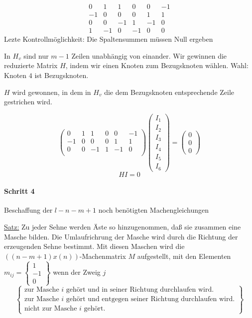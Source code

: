 \documentclass[german]{article}
\begin{document}
	\[
		\begin{array}{cccccc}
			0 & 1 & 1 & 0 & 0 & -1 \\
			-1 & 0 & 0 & 0 & 1 & 1 \\
			0 & 0 & -1 & 1 & -1 & 0 \\
			1 & -1 & 0 & -1 & 0 & 0
		\end{array}
	\]
	Lezte Kontrollmöglichkeit: Die Spaltensummen müssen Null ergeben

	In $H_v$ sind nur $m-1$ Zeilen unabhängig von einander. Wir gewinnen die reduzierte Matrix $H$, indem wir einen Knoten zum Bezugsknoten wählen. Wahl: Knoten $4$ ist Bezugsknoten.

	$H$ wird gewonnen, in dem in $H_v$ die dem Bezugsknoten entsprechende Zeile gestrichen wird.

	\[
		\left(
		\begin{array}{cccccc}
			0 & 1 & 1 & 0 & 0 & -1 \\
			-1 & 0 & 0 & 0 & 1 & 1 \\
			0 & 0 & -1 & 1 & -1 & 0 \\
		\end{array}
		\right)
		\left(
		\begin{array}{c}
			I_1 \\
			I_2 \\
			I_3 \\
			I_4 \\
			I_5 \\
			I_6
		\end{array}
		\right)
		=
		\left(
		\begin{array}{c}
			0 \\
			0 \\
			0
		\end{array}
		\right)
	\]
	\[
		HI = 0
	\]

\paragraph{Schritt 4}
	Beschaffung der $l - n-m+1$ noch benötigten Machengleichungen

	\underline{Satz:} Zu jeder Sehne werden Äste so hinzugenommen, daß sie zusammen eine Masche bilden. Die Umlaufrichrung der Masche wird durch die Richtung der erzeugenden Sehne bestimmt. Mit diesen Maschen wird die $((n-m+1) x (n))$-Machenmatrix $M$ aufgestellt, mit den Elementen
	$m_{ij} = \left\{ \begin{array}{c} 1\\ -1\\ 0 \end{array} \right\}$ wenn der Zweig $j$
	\[
		\left\{
			\begin{array}{c}
				\text{zur Masche } i \text{ gehört und in seiner Richtung durchlaufen wird.}\\
				\text{zur Masche } i \text{ gehört und entgegen seiner Richtung durchlaufen wird.}\\
				\text{nicht zur Masche } i \text{ gehört.}
			\end{array}
		\right\}
	\]
\end{document}
